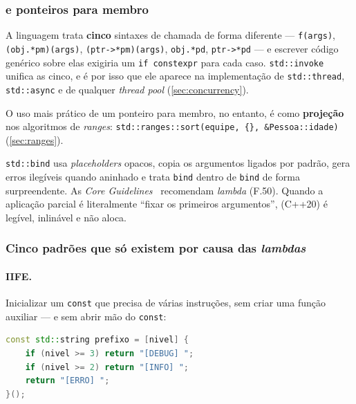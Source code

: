 \subsubsection{ e ponteiros para membro}

A linguagem trata \textbf{cinco} sintaxes de chamada de forma diferente ---
\texttt{f(args)}, \texttt{(obj.*pm)(args)}, \texttt{(ptr->*pm)(args)},
\texttt{obj.*pd}, \texttt{ptr->*pd} --- e escrever código genérico sobre elas
exigiria um \texttt{if constexpr} para cada caso. \texttt{std::invoke} unifica
as cinco, e é por isso que ele aparece na implementação de \texttt{std::thread},
\texttt{std::async} e de qualquer \emph{thread pool} (\cref{sec:concurrency}).

O uso mais prático de um ponteiro para membro, no entanto, é como
\textbf{projeção} nos algoritmos de \emph{ranges}:
\texttt{std::ranges::sort(equipe, \{\}, \&Pessoa::idade)}
(\cref{sec:ranges}).

\begin{regra}
\texttt{std::bind} usa \emph{placeholders} opacos, copia os argumentos ligados
por padrão, gera erros ilegíveis quando aninhado e trata \texttt{bind} dentro de
\texttt{bind} de forma surpreendente. As \emph{Core
Guidelines}~\cite{cppcoreguidelines} recomendam \emph{lambda} (F.50). Quando a
aplicação parcial é literalmente ``fixar os primeiros argumentos'',
 (C++20) é legível, inlinável e não aloca.
\end{regra}

\subsubsection{Cinco padrões que só existem por causa das \emph{lambdas}}

\paragraph{IIFE.} Inicializar um \texttt{const} que precisa de várias instruções,
sem criar uma função auxiliar --- e sem abrir mão do \texttt{const}:

\begin{lstlisting}[style=bt, language=C++,
    caption={\emph{Immediately Invoked Function Expression}.}]
const std::string prefixo = [nivel] {
    if (nivel >= 3) return "[DEBUG] ";
    if (nivel >= 2) return "[INFO] ";
    return "[ERRO] ";
}();
\end{lstlisting}

